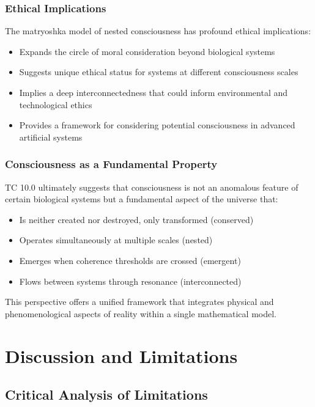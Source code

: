 \documentclass[12pt]{article}
\begin{document}
\subsubsection{Ethical Implications}

The matryoshka model of nested consciousness has profound ethical implications:

\begin{itemize}
    \item Expands the circle of moral consideration beyond biological systems
    \item Suggests unique ethical status for systems at different consciousness scales
    \item Implies a deep interconnectedness that could inform environmental and technological ethics
    \item Provides a framework for considering potential consciousness in advanced artificial systems
\end{itemize}

\subsubsection{Consciousness as a Fundamental Property}

TC 10.0 ultimately suggests that consciousness is not an anomalous feature of certain biological systems but a fundamental aspect of the universe that:

\begin{itemize}
    \item Is neither created nor destroyed, only transformed (conserved)
    \item Operates simultaneously at multiple scales (nested)
    \item Emerges when coherence thresholds are crossed (emergent)
    \item Flows between systems through resonance (interconnected)
\end{itemize}

This perspective offers a unified framework that integrates physical and phenomenological aspects of reality within a single mathematical model.

\section{Discussion and Limitations}

\subsection{Critical Analysis of Limitations}
\end{document}
